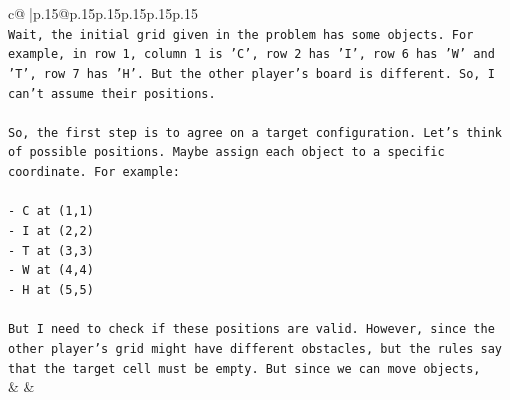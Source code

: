 \documentclass{article}
\begin{document}
{\begin{supertabular}{c@{$\;$}|p{.15\linewidth}@{}p{.15\linewidth}p{.15\linewidth}p{.15\linewidth}p{.15\linewidth}p{.15\linewidth}}
{{{\\ 
\texttt{Wait, the initial grid given in the problem has some objects. For example, in row 1, column 1 is 'C', row 2 has 'I', row 6 has 'W' and 'T', row 7 has 'H'. But the other player's board is different. So, I can't assume their positions.} \\
\\ 
\texttt{So, the first step is to agree on a target configuration. Let's think of possible positions. Maybe assign each object to a specific coordinate. For example:} \\
\\ 
\texttt{{-} C at (1,1)} \\
\texttt{{-} I at (2,2)} \\
\texttt{{-} T at (3,3)} \\
\texttt{{-} W at (4,4)} \\
\texttt{{-} H at (5,5)} \\
\\ 
\texttt{But I need to check if these positions are valid. However, since the other player's grid might have different obstacles, but the rules say that the target cell must be empty. But since we can move objects,} \\
            }
        }
    }
    & & \\ \\


\end{supertabular}}
\end{document}
